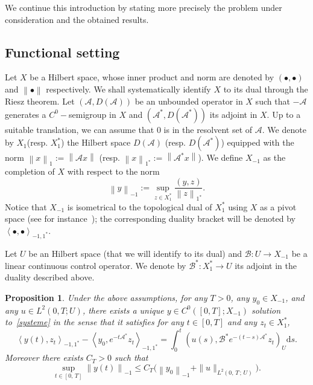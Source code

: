 \documentclass[11pt]{article}
\newtheorem{prop}[theo]{Proposition}
\theoremstyle{definition}
\numberwithin{equation}{section}
\numberwithin{figure}{section}
\numberwithin{table}{section}
\newcommand\A{\mathcal{A}}
\newcommand\As{\mathcal{A}^*}
\newcommand\B{\mathcal{B}}
\newcommand\Bs{\mathcal{B}^*}
\newcommand{\DA}{D(\A)}
\newcommand{\Xun}{X_1}
\newcommand{\Xuns}{X_1^*}
\newcommand{\Xmun}{X_{-1}}
\newcommand{\normeX}[1]{\left\| #1 \right\|}
\newcommand{\normeXun}[1]{\left\| #1 \right\|_{1}}
\newcommand{\normeXuns}[1]{\left\| #1 \right\|_{1^*}}
\newcommand{\normeXmun}[1]{\left\| #1 \right\|_{-1}}
\newcommand{\psX}[2]{\left(#1, #2 \right)}
\newcommand{\psU}[2]{\left(#1, #2 \right)_U}
\newcommand{\dualX}[2]{\left\langle #1, #2 \right\rangle_{-1,1^*}}
\newcommand{\md}{\mathrm{d}}
\renewcommand{\cdot}{{\scriptstyle \bullet}}
\begin{document}
We continue this introduction by stating more precisely the problem under consideration and the obtained results.



\subsection{Functional setting}

Let $X$ be a Hilbert space, whose inner product and norm are denoted by $\psX{\cdot}{\cdot}$ and $\normeX{\cdot}$ respectively. We shall systematically identify $X$ to its dual through the Riesz theorem. Let $(\A, \DA)$ be an unbounded operator in $X$ such that $-\A$ generates a $C^0-$semigroup in $X$ and $(\As,D(\As))$ its adjoint in $X$. Up to a suitable translation, we can assume that $0$ is in the resolvent set of $\A$. We denote by $\Xun$\linebreak(resp. $\Xuns$) the Hilbert space $D(\A)$ (resp. $D(\As)$) equipped with the norm $\normeXun{x} := \normeX{\A x}$ (resp. $\normeXuns{x} := \normeX{\As x}$). We define $\Xmun$ as the completion of $X$ with respect to the norm
\begin{equation*}\label{Def:NormeX-1}
\normeXmun{y} := \sup_{z \in X_1^*} \frac{\psX{y}{z}}{\normeXuns{z}}.
\end{equation*}
Notice that $\Xmun$ is isometrical to the topological dual of $\Xuns$ using $X$ as a pivot space (see for instance~\cite[Proposition~2.10.2]{TucsnakWeissBook}); the corresponding duality bracket will be denoted by $\dualX{\cdot}{\cdot}$.

Let $U$ be an Hilbert space (that we will identify to its dual) and $\B:U\to \Xmun$ be a linear continuous control operator. We denote by $\Bs:\Xuns\to U$ its adjoint in the duality described above.

\begin{prop}\label{Prop:WellposednessGeneral}
Under the above assumptions, for any $T>0$, any $y_0 \in \Xmun$, and any $u \in L^2(0,T ; U)$, there exists a unique $y \in C^0([0,T]; \Xmun)$ solution to~\eqref{systeme} in the sense that it satisfies for any $t \in [0,T]$ and any $z_t \in \Xuns$,
\begin{equation}\label{CaracterisationDualeSolutionsGeneral}
\dualX{y(t)}{z_t} - \dualX{y_0}{e^{-t\As} z_t} = \int_0^t \psU{u(s)}{ \Bs e^{-(t-s) \As} z_t} \md s.
\end{equation}
Moreover there exists $C_T>0$ such that
\[
\sup\limits_{t \in [0,\,T]} \normeXmun{y(t)} \leq C_T \big(\normeXmun{y_0} + \| u \|_{L^2(0,\,T\,;\,U)} \big).
\]
\end{prop}
\end{document}
